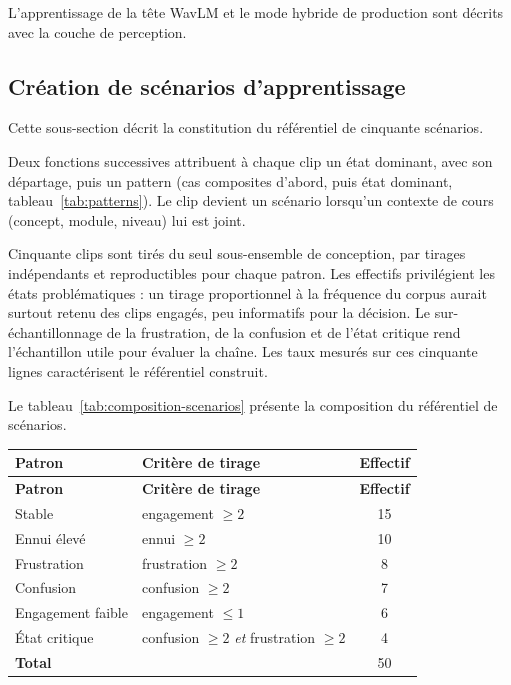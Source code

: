 L'apprentissage de la tête WavLM et le mode hybride de production
sont décrits avec la couche de perception.

\subsection{Création de scénarios d'apprentissage}
\label{subsec:impl-scenarios}

Cette sous-section décrit la constitution du référentiel de
cinquante scénarios.

Deux fonctions successives attribuent à chaque clip un état
dominant, avec son départage, puis un pattern (cas composites
d'abord, puis état dominant, tableau~\ref{tab:patterns}). Le clip
devient un scénario lorsqu'un contexte de cours (concept, module,
niveau) lui est joint.

Cinquante clips sont tirés du seul sous-ensemble de conception, par
tirages indépendants et reproductibles pour chaque patron. Les
effectifs privilégient les états problématiques : un tirage
proportionnel à la fréquence du corpus aurait surtout retenu des
clips engagés, peu informatifs pour la décision. Le
sur-échantillonnage de la frustration, de la confusion et de l'état
critique rend l'échantillon utile pour évaluer la chaîne. Les taux
mesurés sur ces cinquante lignes caractérisent le référentiel
construit.

Le tableau~\ref{tab:composition-scenarios} présente la composition
du référentiel de scénarios.

{\small
\renewcommand{\arraystretch}{1.18}
\setlength{\tabcolsep}{4pt}
\begin{xltabular}{\textwidth}{|>{\raggedright\arraybackslash}X|>{\raggedright\arraybackslash}X|c|}
\hline
{}
\textbf{Patron} & \textbf{Critère de tirage} & \textbf{Effectif} \\
\hline
\endfirsthead
\hline
{}
\textbf{Patron} & \textbf{Critère de tirage} & \textbf{Effectif} \\
\hline
\endhead
\endfoot
\endlastfoot
Stable & engagement $\geq 2$ & 15 \\
\hline
Ennui élevé & ennui $\geq 2$ & 10 \\
\hline
Frustration & frustration $\geq 2$ & 8 \\
\hline
Confusion & confusion $\geq 2$ & 7 \\
\hline
Engagement faible & engagement $\leq 1$ & 6 \\
\hline
État critique & confusion $\geq 2$ \emph{et} frustration $\geq 2$ & 4 \\
\hline
\textbf{Total} & & 50 \\
\hline
\end{xltabular}
\label{tab:composition-scenarios}
}


